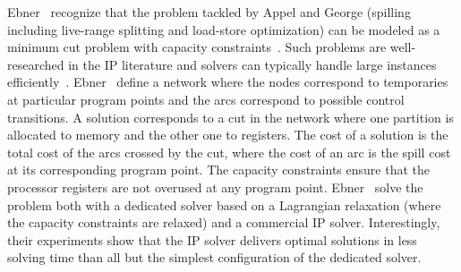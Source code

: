 \documentclass[acmsmall,authorversion,nonacm]{acmart}
\begin{document}
Ebner~\etal{} recognize that the problem tackled by Appel and George
(spilling including live-range splitting and load-store optimization)
can be modeled as a minimum cut problem with capacity
constraints~\cite{Ebner2009}.
Such problems are well-researched in the IP literature and solvers can
typically handle large instances efficiently~\cite{Nemhauser1999}.
Ebner~\etal{} define a network where the nodes correspond to
temporaries at particular program points and the arcs correspond to
possible control transitions.
A solution corresponds to a cut in the network where one partition is
allocated to memory and the other one to registers.
The cost of a solution is the total cost of the arcs crossed by the
cut, where the cost of an arc is the spill cost at its corresponding
program point.
The capacity constraints ensure that the processor registers are not
overused at any program point.
Ebner~\etal{} solve the problem both with a dedicated solver based on
a Lagrangian relaxation (where the capacity constraints are relaxed)
and a commercial IP solver.
Interestingly, their experiments show that the IP solver delivers
optimal solutions in less solving time than all but the simplest
configuration of the dedicated solver.
\end{document}

